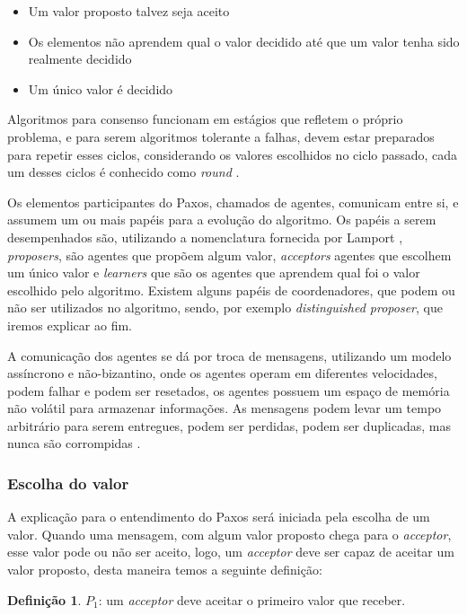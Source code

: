 \documentclass[12pt,
openright, 
oneside,
a4paper,
brazil]{facom-ufu-abntex2}
\theoremstyle{definition}
\newtheorem*{definition}{Definição}
\begin{document}
\begin{itemize}
    \item Um valor proposto talvez seja aceito
    \item Os elementos não aprendem qual o valor decidido até que um valor 
    tenha sido realmente decidido
    \item Um único valor é decidido
\end{itemize}

Algoritmos para consenso funcionam em estágios que refletem o próprio problema, e para
serem algoritmos tolerante a falhas, devem estar preparados para repetir esses ciclos,
considerando os valores escolhidos no ciclo passado, cada um desses ciclos é conhecido como
\textit{round} \citep{camargos2008multicoordinated}.

Os elementos participantes do Paxos, chamados de agentes, comunicam entre si, e assumem 
um ou mais papéis para a evolução do algoritmo. Os papéis a serem desempenhados são, 
utilizando a nomenclatura fornecida por Lamport \citep{lamport2001paxos}, 
\textit{proposers}, são agentes que propõem algum valor, \textit{acceptors} 
agentes que escolhem um único valor e \textit{learners} que são os agentes que aprendem
qual foi o valor escolhido pelo algoritmo.
Existem alguns papéis de coordenadores, que podem ou não ser utilizados no algoritmo, 
sendo, por exemplo \textit{distinguished proposer}, que iremos explicar ao fim.

A comunicação dos agentes se dá por troca de mensagens, utilizando um modelo assíncrono e
não-bizantino, onde os agentes operam em diferentes velocidades, podem falhar e podem ser
resetados, os agentes possuem um espaço de memória não volátil para armazenar informações.
As mensagens podem levar um tempo arbitrário para serem entregues, podem ser perdidas, podem
ser duplicadas, mas nunca são corrompidas \citep{lamport2001paxos}.

\subsubsection{Escolha do valor}
A explicação para o entendimento do Paxos será iniciada pela escolha de um valor. 
Quando uma mensagem, com algum
valor proposto chega para o \textit{acceptor}, esse valor pode ou não ser aceito, logo,
um \textit{acceptor} deve ser capaz de aceitar um valor proposto, desta maneira temos a seguinte 
definição:

\begin{definition}
$P_1$: um \textit{acceptor} deve aceitar o primeiro valor que receber.
\end{definition}
\end{document}
